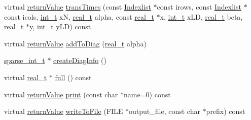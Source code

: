 \begin{DoxyCompactItemize}
\item 
virtual \hyperlink{_message_handling_8hpp_a81d556f613bfbabd0b1f9488c0fa865e}{return\+Value} \hyperlink{class_sparse_matrix_row_ab06b8d77a5dc1368ebab56a80d782d60}{trans\+Times} (const \hyperlink{class_indexlist}{Indexlist} $\ast$const irows, const \hyperlink{class_indexlist}{Indexlist} $\ast$const icols, \hyperlink{_types_8hpp_ab6fd6105e64ed14a0c9281326f05e623}{int\+\_\+t} xN, \hyperlink{qp_o_a_s_e_s__wrapper_8h_a0d00e2b3dfadee81331bbb39068570c4}{real\+\_\+t} alpha, const \hyperlink{qp_o_a_s_e_s__wrapper_8h_a0d00e2b3dfadee81331bbb39068570c4}{real\+\_\+t} $\ast$x, \hyperlink{_types_8hpp_ab6fd6105e64ed14a0c9281326f05e623}{int\+\_\+t} x\+LD, \hyperlink{qp_o_a_s_e_s__wrapper_8h_a0d00e2b3dfadee81331bbb39068570c4}{real\+\_\+t} beta, \hyperlink{qp_o_a_s_e_s__wrapper_8h_a0d00e2b3dfadee81331bbb39068570c4}{real\+\_\+t} $\ast$y, \hyperlink{_types_8hpp_ab6fd6105e64ed14a0c9281326f05e623}{int\+\_\+t} y\+LD) const
\item 
virtual \hyperlink{_message_handling_8hpp_a81d556f613bfbabd0b1f9488c0fa865e}{return\+Value} \hyperlink{class_sparse_matrix_row_a6feb397255c49e09d2cb25b2b5bef57d}{add\+To\+Diag} (\hyperlink{qp_o_a_s_e_s__wrapper_8h_a0d00e2b3dfadee81331bbb39068570c4}{real\+\_\+t} alpha)
\item 
\hyperlink{_types_8hpp_aa5432b00c9081e2d62d7f38c32e4ed80}{sparse\+\_\+int\+\_\+t} $\ast$ \hyperlink{class_sparse_matrix_row_a3e72a351698454ba063f3b0814f919c8}{create\+Diag\+Info} ()
\item 
virtual \hyperlink{qp_o_a_s_e_s__wrapper_8h_a0d00e2b3dfadee81331bbb39068570c4}{real\+\_\+t} $\ast$ \hyperlink{class_sparse_matrix_row_ae074d0a3c434867b07552401e9b3174d}{full} () const
\item 
virtual \hyperlink{_message_handling_8hpp_a81d556f613bfbabd0b1f9488c0fa865e}{return\+Value} \hyperlink{class_sparse_matrix_row_a471469c7fc2240bd379b8a3aa64634a9}{print} (const char $\ast$name=0) const
\item 
virtual \hyperlink{_message_handling_8hpp_a81d556f613bfbabd0b1f9488c0fa865e}{return\+Value} \hyperlink{class_sparse_matrix_row_ab9f4e7e9bbbc8ddd52d55c97a4dad3ff}{write\+To\+File} (F\+I\+LE $\ast$output\+\_\+file, const char $\ast$prefix) const
\end{DoxyCompactItemize}
